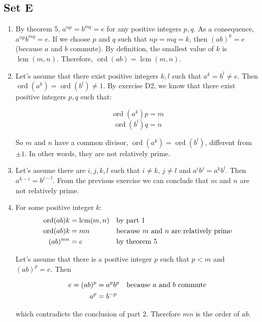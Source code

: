 \documentclass{article}
\DeclareMathOperator{\ord}{ord}
\DeclareMathOperator{\lcm}{lcm}
\begin{document}
\subsection{Set E}
\begin{enumerate}
    \item By theorem 5, $ a^{np} = b^{mq} = e $ for any positive integers $ p, q $. As a consequence, $ a^{np}b^{mq} = e $. If we choose $ p $ and $ q $ such that $ np = mq = k $, then $ (ab)^k = e $ (because $ a $ and $ b $ commute). By definition, the smallest value of $ k $ is $ \lcm(m, n) $. Therefore, $ \ord(ab) = \lcm(m, n) $.    

    \item Let's assume that there exist positive integers $ k, l $ such that $ a^k = b^l \ne e $. Then $ \ord(a^k) = \ord(b^l) \ne 1 $. By exercise D2, we know that there exist positive integers $ p, q $ such that:

    $$ \ord(a^k)p = m $$
    $$ \ord(b^l)q = n $$

    So $ m $ and $ n $ have a common divisor, $ \ord(a^k) = \ord(b^l) $, different from $ \pm 1 $. In other words, they are not relatively prime.

    \item Let's assume there are $ i, j, k, l $ such that $ i \ne k $, $ j \ne l $ and $ a^ib^j = a^kb^l $. Then $ a^{k - i} = b^{j -l} $. From the previous exercise we can conclude that $ m $ and $ n $ are not relatively prime.

    \item For some positive integer $ k $:
        \begin{align*}
            \ord(ab)k &= \lcm(m, n) && \text{by part 1} \\
            \ord(ab)k &= mn && \text{because $ m $ and $ n $ are relatively prime} \\
            (ab)^{mn} &= e && \text{by theorem 5}
        \end{align*}

        Let's assume that there is a positive integer $ p $ such that $  p < m $ and $ (ab)^p = e$. Then

        \begin{align*}
            e = (ab)^p &= a^pb^p && \text{because $ a $ and $ b $ commute} \\
            a^p &= b^{-p}
        \end{align*}

        which contradicts the conclusion of part 2. Therefore $ mn $ is the order of $ ab $.


\end{enumerate}
\end{document}
